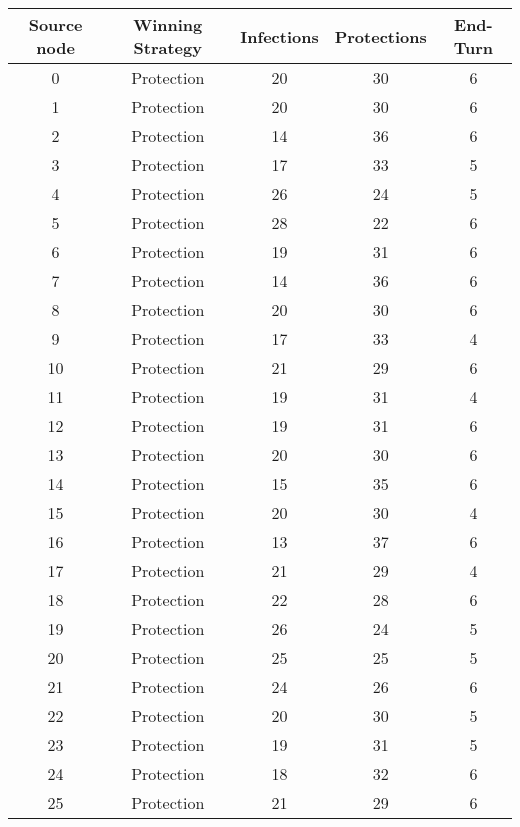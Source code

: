 \documentclass[results.tex]{subfiles}
\begin{document}
\begin{center}
  \begin{tabular}{| c || c | c | c | c |}
    \hline
    {\bfseries Source node} & {\bfseries Winning Strategy} & {\bfseries Infections} & {\bfseries Protections} & {\bfseries End-Turn} \\  %
    \hline\hline
    0 & Protection & 20 & 30 & 6 \\ 
    \hline
    1 & Protection & 20 & 30 & 6 \\ 
    \hline
    2 & Protection & 14 & 36 & 6 \\ 
    \hline
    3 & Protection & 17 & 33 & 5 \\ 
    \hline
    4 & Protection & 26 & 24 & 5 \\ 
    \hline
    5 & Protection & 28 & 22 & 6 \\ 
    \hline
    6 & Protection & 19 & 31 & 6 \\ 
    \hline
    7 & Protection & 14 & 36 & 6 \\ 
    \hline
    8 & Protection & 20 & 30 & 6 \\ 
    \hline
    9 & Protection & 17 & 33 & 4 \\ 
    \hline
    10 & Protection & 21 & 29 & 6 \\ 
    \hline
    11 & Protection & 19 & 31 & 4 \\ 
    \hline
    12 & Protection & 19 & 31 & 6 \\ 
    \hline
    13 & Protection & 20 & 30 & 6 \\ 
    \hline
    14 & Protection & 15 & 35 & 6 \\ 
    \hline
    15 & Protection & 20 & 30 & 4 \\ 
    \hline
    16 & Protection & 13 & 37 & 6 \\ 
    \hline
    17 & Protection & 21 & 29 & 4 \\ 
    \hline
    18 & Protection & 22 & 28 & 6 \\ 
    \hline
    19 & Protection & 26 & 24 & 5 \\ 
    \hline
    20 & Protection & 25 & 25 & 5 \\ 
    \hline
    21 & Protection & 24 & 26 & 6 \\ 
    \hline
    22 & Protection & 20 & 30 & 5 \\ 
    \hline
    23 & Protection & 19 & 31 & 5 \\ 
    \hline
    24 & Protection & 18 & 32 & 6 \\ 
    \hline
    25 & Protection & 21 & 29 & 6 \\ 

\end{tabular}
\end{center}
\end{document}
